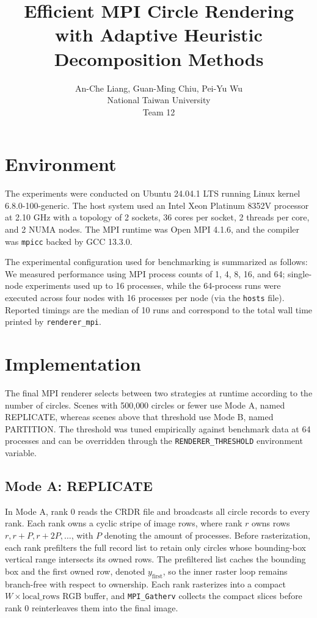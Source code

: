 \documentclass{article}
\title{Efficient MPI Circle Rendering with Adaptive Heuristic Decomposition Methods}
\author{%
  An-Che Liang, Guan-Ming Chiu, Pei-Yu Wu\\
  National Taiwan University\\
  Team 12\\
}
\begin{document}
\maketitle

\section{Environment}
The experiments were conducted on Ubuntu 24.04.1 LTS running Linux kernel 6.8.0-100-generic. The host system used an Intel Xeon Platinum 8352V processor at 2.10 GHz with a topology of 2 sockets, 36 cores per socket, 2 threads per core, and 2 NUMA nodes. The MPI runtime was Open MPI 4.1.6, and the compiler was \texttt{mpicc} backed by GCC 13.3.0.

The experimental configuration used for benchmarking is summarized as follows: We measured performance using MPI process
counts of 1, 4, 8, 16, and 64; single-node experiments used up to 16 processes, while the 64-process runs were
executed across four nodes with 16 processes per node (via the \texttt{hosts} file). Reported timings are the
median of 10 runs and correspond to the total wall time printed by \texttt{renderer\_mpi}.

\section{Implementation}
The final MPI renderer selects between two strategies at runtime according to the number of circles. Scenes with 500{,}000 circles or fewer use Mode A, named REPLICATE, whereas scenes above that threshold use Mode B, named PARTITION. The threshold was tuned empirically against benchmark data at 64 processes and can be overridden through the \texttt{RENDERER\_THRESHOLD} environment variable.

\subsection{Mode A: REPLICATE}
In Mode A, rank 0 reads the CRDR file and broadcasts all circle records to every rank. Each rank owns a cyclic stripe of image rows, where rank \(r\) owns rows \(r, r + P, r + 2P, \dots\), with \(P\) denoting the amount of processes. Before rasterization, each rank prefilters the full record list to retain only circles whose bounding-box vertical range intersects its owned rows. The prefiltered list caches the bounding box and the first owned row, denoted \(y_{\mathrm{first}}\), so the inner raster loop remains branch-free with respect to ownership. Each rank rasterizes into a compact \(W \times \mathrm{local\_rows}\) RGB buffer, and \texttt{MPI\_Gatherv} collects the compact slices before rank 0 reinterleaves them into the final image.
\end{document}
